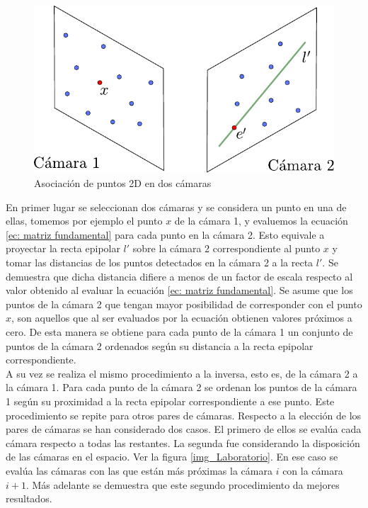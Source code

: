 \begin{figure}[H]
\begin{center}
\includegraphics[scale=0.7]{img/Reconstruccion/cam2cam.pdf}
\end{center}
\caption{Asociación de puntos 2D en dos cámaras}
\label{fig: cam2cam }
\end{figure}

En primer lugar se seleccionan dos cámaras y se considera un punto en una de ellas, tomemos por ejemplo el punto $x$ de la cámara 1, y evaluemos la ecuación \ref{ec: matriz fundamental} para cada punto en la cámara 2. Esto equivale a proyectar la recta epipolar $l'$ sobre la cámara 2 correspondiente al punto $x$ y tomar las distancias de los puntos detectados en la cámara 2 a la recta $l'$. Se demuestra que dicha distancia difiere a menos de un factor de escala respecto al valor obtenido al evaluar la ecuación \ref{ec: matriz fundamental}. Se asume que los puntos de la cámara 2 que tengan mayor posibilidad de corresponder con el punto $x$, son aquellos que al ser evaluados por la ecuación obtienen valores próximos a cero.
De esta manera se obtiene para cada punto de la cámara 1 un conjunto de puntos de la cámara 2 ordenados según su distancia a la recta epipolar correspondiente.\\

A su vez se realiza el mismo procedimiento a la inversa, esto es, de la cámara 2 a la cámara 1. Para cada punto de la cámara 2 se ordenan los puntos de la cámara 1 según su proximidad a la recta epipolar correspondiente a ese punto. Este procedimiento se repite para otros pares de cámaras. Respecto a la elección de los pares de cámaras se han considerado dos casos. El primero de ellos se evalúa cada cámara respecto a todas las restantes. La segunda fue considerando la disposición de las cámaras en el espacio. Ver la figura \ref{img_Laboratorio}. En ese caso se evalúa las cámaras con las que están más próximas la cámara $i$ con la cámara $i+1$. Más adelante se demuestra que este segundo procedimiento da mejores resultados. \\

